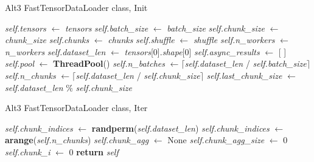 \documentclass[pdfa%
,cucitura%
]{toptesi}
\begin{document}
\begin{algorithm}[h!]
	\caption{Alt3 FastTensorDataLoader class, Init}\label{alg:Alt3FastDataLoaderInit}
	\begin{algorithmic}[1]
		\State \textit{self.tensors} $\gets$ \textit{tensors}
		\State \textit{self.batch\_size} $\gets$ \textit{batch\_size}
		\State \textit{self.chunk\_size} $\gets$ \textit{chunk\_size}
		\State \textit{self.chunks} $\gets$ \textit{chunks}
		\State \textit{self.shuffle} $\gets$ \textit{shuffle}
		\State \textit{self.n\_workers} $\gets$ \textit{n\_workers}
		\State \textit{self.dataset\_len} $\gets$ \textit{tensors}[0].\textit{shape}[0]
		\State
		\State \textit{self.async\_results} $\gets$ [ ]
		\State \textit{self.pool} $\gets$ \textbf{ThreadPool}()
		\EndIf
		\State
		\State \textit{self.n\_batches} $\gets \lceil$\textit{self.dataset\_len} / \textit{self.batch\_size}$\rceil$
		\State \textit{self.n\_chunks} $\gets \lceil$\textit{self.dataset\_len} / \textit{self.chunk\_size}$\rceil$
		\State \textit{self.last\_chunk\_size} $\gets$ \textit{self.dataset\_len} $\%$ \textit{self.chunk\_size}
		\EndFunction
	\end{algorithmic}
\end{algorithm}

\begin{algorithm}[h!]
	\caption{Alt3 FastTensorDataLoader class, Iter}\label{alg:Alt3FastDataLoaderIter}
	\begin{algorithmic}[1]
		\State \textit{self.chunk\_indices} $\gets$ \textbf{randperm}(\textit{self.dataset\_len})
		\Else
		\State \textit{self.chunk\_indices} $\gets$ \textbf{arange}(\textit{self.n\_chunks})
		\EndIf
		\State
		\State \textit{self.chunk\_agg} $\gets$ None
		\State \textit{self.chunk\_agg\_size} $\gets$ 0
		\State \textit{self.chunk\_i} $\gets$ 0
		\State \textbf{return} \textit{self}			
		\EndFunction
	\end{algorithmic}
\end{algorithm}
\end{document}
